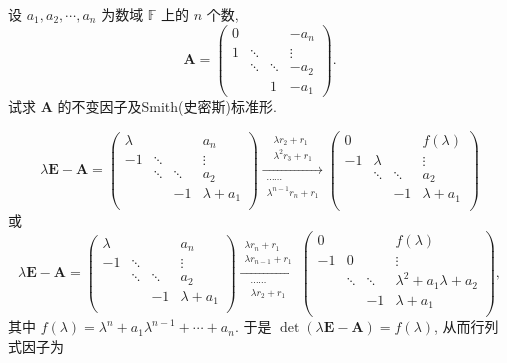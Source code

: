 \documentclass[../../main.tex]{subfiles}
\begin{document}
\begin{example}
设 $a_1, a_2, \cdots, a_n$ 为数域 $\mathbb{F}$ 上的 $n$ 个数,
\[
\boldsymbol{A} = \begin{pmatrix} 
0 & & & -a_n \\
1 & \ddots & & \vdots \\
& \ddots & \ddots & -a_2 \\
& & 1 & -a_1 
\end{pmatrix}.
\]
试求 $\boldsymbol{A}$ 的不变因子及Smith(史密斯)标准形.
\end{example}
\begin{solution}
$$\lambda\boldsymbol{E}-\boldsymbol{A}=\begin{pmatrix}
\lambda& & & a_n\\
-1& \ddots& & \vdots\\
& \ddots& \ddots& a_2\\
& & -1& \lambda +a_1\\
\end{pmatrix}\xrightarrow[\substack{\cdots \cdots\\\lambda ^{n-1}r_n+r_1}]{\substack{\lambda r_2+r_1\\\lambda ^2r_3+r_1}}\begin{pmatrix}
0& & & f\left( \lambda \right)\\
-1& \lambda& & \vdots\\
& \ddots& \ddots& a_2\\
& & -1& \lambda +a_1\\
\end{pmatrix}$$
或
$$\lambda\boldsymbol{E}-\boldsymbol{A}=\begin{pmatrix}
\lambda& & & a_n\\
-1& \ddots& & \vdots\\
& \ddots& \ddots& a_2\\
& & -1& \lambda +a_1\\
\end{pmatrix}\xrightarrow[\substack{\cdots \cdots\\\lambda r_2+r_1}]{\substack{\lambda r_n+r_1\\\lambda r_{n-1}+r_1}}\begin{pmatrix}
0& & & f\left( \lambda \right)\\
-1& 0& & \vdots\\
& \ddots& \ddots& \lambda ^2+a_1\lambda +a_2\\
& & -1& \lambda +a_1\\
\end{pmatrix},$$
其中 $f(\lambda) = \lambda^n + a_1\lambda^{n-1} + \cdots + a_n$. 于是 $\det(\lambda\boldsymbol{E} - \boldsymbol{A}) = f(\lambda)$, 从而行列式因子为

\end{solution}
\end{document}

